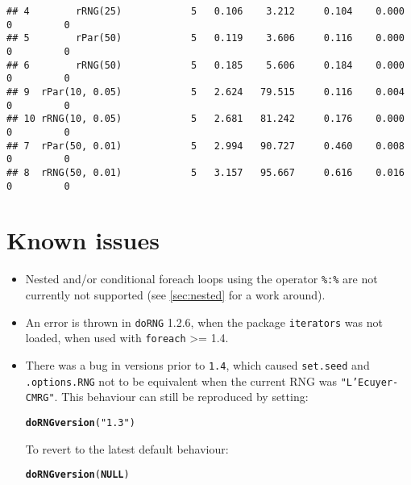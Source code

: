 \documentclass[a4paper,12pt]{article}\usepackage[]{graphicx}\usepackage[]{color}
\makeatletter
\newcommand{\hlstr}[1]{\textcolor[rgb]{0.192,0.494,0.8}{#1}}%
\newcommand{\hlstd}[1]{\textcolor[rgb]{0.345,0.345,0.345}{#1}}%
\newcommand{\hlkwa}[1]{\textcolor[rgb]{0.161,0.373,0.58}{\textbf{#1}}}%
\newcommand{\hlkwd}[1]{\textcolor[rgb]{0.737,0.353,0.396}{\textbf{#1}}}%
\newenvironment{kframe}{%
 \def\at@end@of@kframe{}%
 \ifinner\ifhmode%
  \def\at@end@of@kframe{\end{minipage}}%
  \begin{minipage}{\columnwidth}%
 \fi\fi%
 \def\FrameCommand##1{\hskip\@totalleftmargin \hskip-\fboxsep
 \colorbox{shadecolor}{##1}\hskip-\fboxsep
     \hskip-\linewidth \hskip-\@totalleftmargin \hskip\columnwidth}%
 \MakeFramed {\advance\hsize-\width
   \@totalleftmargin\z@ \linewidth\hsize
   \@setminipage}}%
 {\par\unskip\endMakeFramed%
 \at@end@of@kframe}
\newenvironment{knitrout}{}{} %
\let\code=\texttt
\makeatother
\begin{document}
\begin{knitrout}
\begin{kframe}
\begin{verbatim}
## 4        rRNG(25)            5   0.106    3.212     0.104    0.000          0         0
## 5        rPar(50)            5   0.119    3.606     0.116    0.000          0         0
## 6        rRNG(50)            5   0.185    5.606     0.184    0.000          0         0
## 9  rPar(10, 0.05)            5   2.624   79.515     0.116    0.004          0         0
## 10 rRNG(10, 0.05)            5   2.681   81.242     0.176    0.000          0         0
## 7  rPar(50, 0.01)            5   2.994   90.727     0.460    0.008          0         0
## 8  rRNG(50, 0.01)            5   3.157   95.667     0.616    0.016          0         0
\end{verbatim}
\end{kframe}
\end{knitrout}


\section{Known issues}
\label{sec:issues}

\begin{itemize}
\item Nested and/or conditional foreach loops using the operator \code{\%:\%} are not 
currently not supported (see \cref{sec:nested} for a work around).
\item An error is thrown in \code{doRNG} 1.2.6, when the package \code{iterators} was not loaded, when used with 
\code{foreach} >= 1.4.
\item There was a bug in versions prior to \code{1.4}, which caused \code{set.seed} and 
\code{.options.RNG} not to be equivalent when the current RNG was \code{"L'Ecuyer-CMRG"}.
This behaviour can still be reproduced by setting:
\begin{knitrout}\footnotesize
{}\color{fgcolor}\begin{kframe}
\begin{alltt}
\hlkwd{doRNGversion}\hlstd{(}\hlstr{"1.3"}\hlstd{)}
\end{alltt}
\end{kframe}
\end{knitrout}

To revert to the latest default behaviour:
\begin{knitrout}\footnotesize
{}\color{fgcolor}\begin{kframe}
\begin{alltt}
\hlkwd{doRNGversion}\hlstd{(}\hlkwa{NULL}\hlstd{)}
\end{alltt}
\end{kframe}
\end{knitrout}

\end{itemize} 
\end{document}
